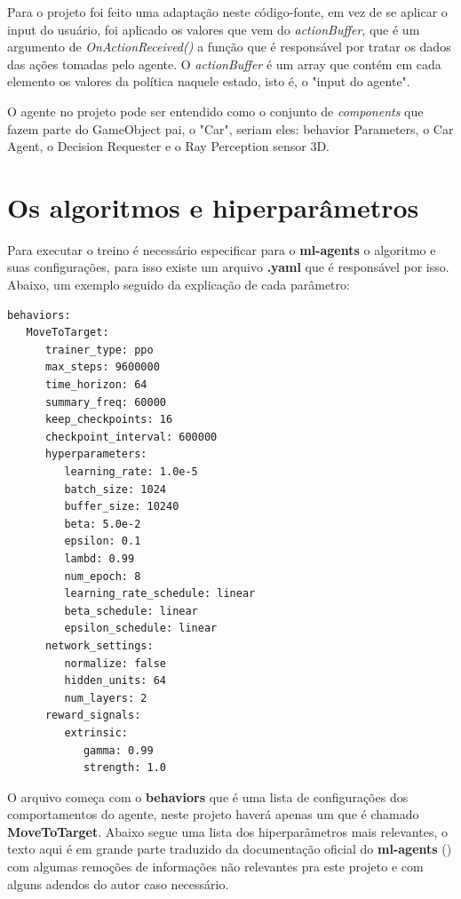 Para o projeto foi feito uma adaptação neste código-fonte, em vez de se aplicar o input do usuário, foi aplicado os valores que vem do \textit{actionBuffer}, que é um argumento de \textit{OnActionReceived()} a função que é responsável por tratar os dados das ações tomadas pelo agente. O \textit{actionBuffer} é um array que contém em cada elemento os valores da política naquele estado, isto é, o "input do agente".

O agente no projeto pode ser entendido como o conjunto de \textit{components} que fazem parte do GameObject pai, o "Car", seriam eles: behavior Parameters, o Car Agent, o Decision Requester e o Ray Perception sensor 3D. 

\section{Os algoritmos e hiperparâmetros}\label{algoritmos}
Para executar o treino é necessário especificar para o \textbf{ml-agents} o algoritmo e suas configurações, para isso existe um arquivo \textbf{.yaml} que é responsável por isso. Abaixo, um exemplo seguido da explicação de cada parâmetro:

\begin{lstlisting}
behaviors:
   MoveToTarget:
      trainer_type: ppo
      max_steps: 9600000
      time_horizon: 64
      summary_freq: 60000
      keep_checkpoints: 16     
      checkpoint_interval: 600000
      hyperparameters:
         learning_rate: 1.0e-5
         batch_size: 1024
         buffer_size: 10240
         beta: 5.0e-2
         epsilon: 0.1
         lambd: 0.99
         num_epoch: 8
         learning_rate_schedule: linear
         beta_schedule: linear
         epsilon_schedule: linear
      network_settings:
         normalize: false
         hidden_units: 64
         num_layers: 2
      reward_signals:
         extrinsic:
            gamma: 0.99
            strength: 1.0
\end{lstlisting}

O arquivo começa com o \textbf{behaviors} que é uma lista de configurações dos comportamentos do agente, neste projeto haverá apenas um que é chamado \textbf{MoveToTarget}. Abaixo segue uma lista dos hiperparâmetros mais relevantes, o texto aqui é em grande parte traduzido da documentação oficial do \textbf{ml-agents} () com algumas remoções de informações não relevantes pra este projeto e com alguns adendos do autor caso necessário.


